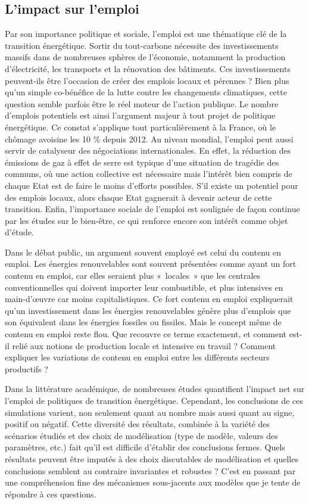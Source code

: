 \subsection{L'impact sur l'emploi}
Par son importance politique et sociale, l'emploi est une thématique clé de la transition énergétique. Sortir du tout-carbone nécessite des investissements massifs dans de nombreuses sphères de l'économie, notamment la production d'électricité, les transports et la rénovation des bâtiments. Ces investissements peuvent-ils être l'occasion de créer des emplois locaux et pérennes ?
Bien plus qu'un simple co-bénéfice de la lutte contre les changements climatiques, cette question semble parfois être le réel moteur de l'action publique. Le nombre d'emplois potentiels est ainsi l'argument majeur à tout projet de politique énergétique. Ce constat s'applique tout particulièrement à la France, où le chômage avoisine les 10 \% depuis 2012.
Au niveau mondial, l'emploi peut aussi servir de catalyseur des négociations internationales. En effet, la réduction des émissions de gaz à effet de serre est typique d'une situation de tragédie des communs, où une action collective est nécessaire mais l'intérêt bien compris de chaque Etat est de faire le moins d'efforts possibles. S'il existe un potentiel pour des emplois locaux, alors chaque Etat gagnerait à devenir acteur de cette transition. 
Enfin, l'importance sociale de l'emploi est soulignée de façon continue par les études sur le bien-être, ce qui renforce encore son intérêt comme objet d'étude.

Dans le débat public, un argument souvent employé est celui du contenu en emploi. Les énergies renouvelables sont souvent présentées comme ayant un fort contenu en emploi, car elles seraient plus «~locales~» que les centrales conventionnelles qui doivent importer leur combustible, et plus intensives en main-d'\oe{}uvre car moins capitalistiques. Ce fort contenu en emploi expliquerait qu'un investissement dans les énergies renouvelables génère plus d'emplois que son équivalent dans les énergies fossiles ou fissiles. Mais le concept même de contenu en emploi reste flou. Que recouvre ce terme exactement, et comment est-il relié aux notions de production locale et intensive en travail ? Comment expliquer les variations de contenu en emploi entre les différents secteurs productifs ?

Dans la littérature académique, de nombreuses études quantifient l'impact net sur l'emploi de politiques de transition énergétique. Cependant, les conclusions de ces simulations varient, non seulement quant au nombre mais aussi quant au signe, positif ou négatif. Cette diversité des résultats, combinée à la variété des scénarios étudiés et des choix de modélisation (type de modèle, valeurs des paramètres, etc.) fait qu'il est difficile d'établir des conclusions fermes. 
Quels résultats peuvent être imputés à des choix discutables de modélisation et quelles conclusions semblent au contraire invariantes et robustes ? C'est en passant par une compréhension fine des mécanismes sous-jacents aux modèles que je tente de répondre à ces questions.

